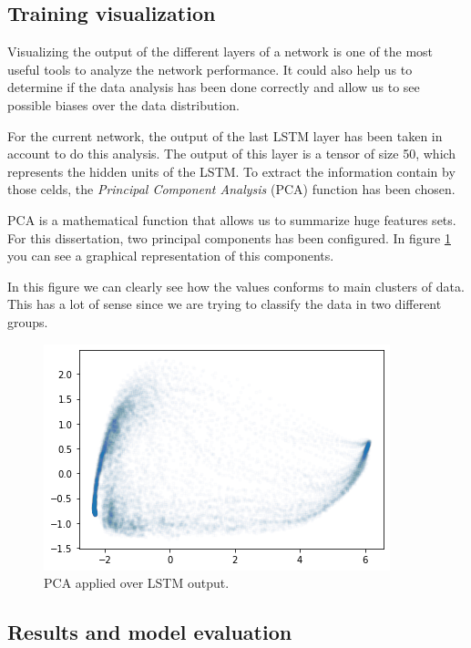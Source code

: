 \subsection{Training visualization}

Visualizing the output of the different layers of a network is one of the most useful tools to analyze the network performance. It could also help us to determine if the data analysis has been done correctly and allow us to see possible biases over the data distribution.

For the current network, the output of the last LSTM layer has been taken in account to do this analysis. The output of this layer is a tensor of size 50, which represents the hidden units of the LSTM. To extract the information contain by those celds, the \textit{Principal Component Analysis} (PCA) function has been chosen.

PCA is a mathematical function that allows us to summarize huge features sets. For this dissertation, two principal components has been configured. In figure \ref{fig:binary-lstm-pca} you can see a graphical representation of this components.

In this figure we can clearly see how the values conforms to main clusters of data. This has a lot of sense since we are trying to classify the data in two different groups.

\begin{figure}
\centering
\includegraphics{Figures/lstm-visualization}
\decoRule
\caption[PCA applied over LSTM output]{PCA applied over LSTM output.}
\label{fig:binary-lstm-pca}
\end{figure}


\subsection{Results and model evaluation}

